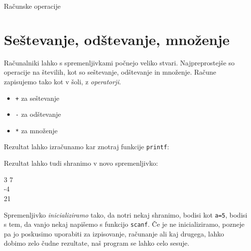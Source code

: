 
Računske operacije

\section{Seštevanje, odštevanje, množenje}
Računalniki lahko s spremenljivkami počnejo veliko stvari. Najpreprostejše so  operacije na številih, kot so seštevanje, odštevanje in množenje. Račune zapisujemo tako kot v šoli, z \emph{operatorji}.
\begin{itemize}
	\item \verb-+- za seštevanje
	\item \verb+-+ za odštevanje
	\item \verb+*+ za množenje
\end{itemize}

Rezultat lahko izračunamo kar znotraj funkcije \verb+printf+:


\begin{examples}


\begin{inout}

\end{inout}


\end{examples}

\pagebreak
Rezultat lahko tudi shranimo v novo spremenljivko:
\begin{examples}


\begin{inout}
3 7
\\
-4\\
21
\end{inout}

\end{examples}

\begin{errors}
Spremenljivko \emph{inicializiramo} tako, da notri nekaj shranimo, bodisi kot \verb+a=5+, bodisi s tem, da vanjo nekaj napišemo s funkcijo \verb+scanf+.
Če je ne inicializiramo, pozneje pa jo poskusimo uporabiti za izpisovanje, računanje ali kaj drugega, lahko dobimo zelo čudne rezultate, naš program se lahko celo sesuje.
\end{errors}

